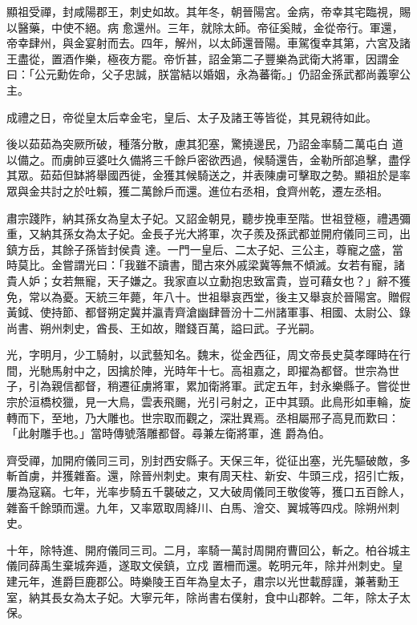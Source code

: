 \begin{pinyinscope}
 顯祖受禪，封咸陽郡王，刺史如故。其年冬，朝晉陽宮。金病，帝幸其宅臨視，賜以醫藥，中使不絕。病
 愈還州。三年，就除太師。帝征奚賊，金從帝行。軍還，帝幸肆州，與金宴射而去。四年，解州，以太師還晉陽。車駕復幸其第，六宮及諸王盡從，置酒作樂，極夜方罷。帝忻甚，詔金第二子豐樂為武衛大將軍，因謂金曰：「公元勳佐命，父子忠誠，朕當結以婚姻，永為蕃衛。」仍詔金孫武都尚義寧公主。



 成禮之日，帝從皇太后幸金宅，皇后、太子及諸王等皆從，其見親待如此。



 後以茹茹為突厥所破，種落分散，慮其犯塞，驚撓邊民，乃詔金率騎二萬屯白
 道以備之。而虜帥豆婆吐久備將三千餘戶密欲西過，候騎還告，金勒所部追擊，盡俘其眾。茹茹但缽將舉國西徙，金獲其候騎送之，并表陳虜可擊取之勢。顯祖於是率眾與金共討之於吐賴，獲二萬餘戶而還。進位右丞相，食齊州乾，遷左丞相。



 肅宗踐阼，納其孫女為皇太子妃。又詔金朝見，聽步挽車至階。世祖登極，禮遇彌重，又納其孫女為太子妃。金長子光大將軍，次子羨及孫武都並開府儀同三司，出鎮方岳，其餘子孫皆封侯貴
 達。一門一皇后、二太子妃、三公主，尊寵之盛，當時莫比。金嘗謂光曰：「我雖不讀書，聞古來外戚梁冀等無不傾滅。女若有寵，諸貴人妒；女若無寵，天子嫌之。我家直以立勳抱忠致富貴，豈可藉女也？」辭不獲免，常以為憂。天統三年薨，年八十。世祖舉哀西堂，後主又舉哀於晉陽宮。贈假黃鉞、使持節、都督朔定冀并瀛青齊滄幽肆晉汾十二州諸軍事、相國、太尉公、錄尚書、朔州刺史，酋長、王如故，贈錢百萬，謚曰武。子光嗣。



 光，字明月，少工騎射，以武藝知名。魏末，從金西征，周文帝長史莫孝暉時在行間，光馳馬射中之，因擒於陣，光時年十七。高祖嘉之，即擢為都督。世宗為世子，引為親信都督，稍遷征虜將軍，累加衛將軍。武定五年，封永樂縣子。嘗從世宗於洹橋校獵，見一大鳥，雲表飛颺，光引弓射之，正中其頸。此鳥形如車輪，旋轉而下，至地，乃大雕也。世宗取而觀之，深壯異焉。丞相屬邢子高見而歎曰：「此射雕手也。」當時傳號落雕都督。尋兼左衛將軍，進
 爵為伯。



 齊受禪，加開府儀同三司，別封西安縣子。天保三年，從征出塞，光先驅破敵，多斬首虜，并獲雜畜。還，除晉州刺史。東有周天柱、新安、牛頭三戍，招引亡叛，屢為寇竊。七年，光率步騎五千襲破之，又大破周儀同王敬俊等，獲口五百餘人，雜畜千餘頭而還。九年，又率眾取周絳川、白馬、澮交、翼城等四戍。除朔州刺史。



 十年，除特進、開府儀同三司。二月，率騎一萬討周開府曹回公，斬之。柏谷城主儀同薛禹生棄城奔遁，遂取文侯鎮，立戍
 置柵而還。乾明元年，除并州刺史。皇建元年，進爵巨鹿郡公。時樂陵王百年為皇太子，肅宗以光世載醇謹，兼著勳王室，納其長女為太子妃。大寧元年，除尚書右僕射，食中山郡幹。二年，除太子太保。




\end{pinyinscope}
